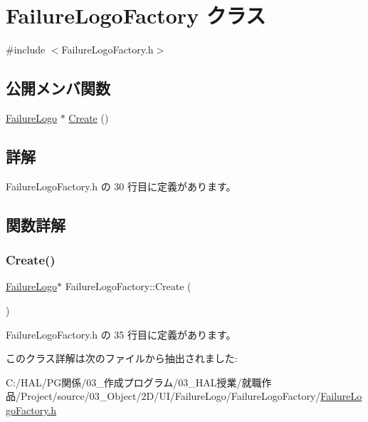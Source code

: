 \hypertarget{class_failure_logo_factory}{}\section{Failure\+Logo\+Factory クラス}
\label{class_failure_logo_factory}


{\ttfamily \#include $<$Failure\+Logo\+Factory.\+h$>$}

\subsection*{公開メンバ関数}
\begin{DoxyCompactItemize}
\item 
\mbox{\hyperlink{class_failure_logo}{Failure\+Logo}} $\ast$ \mbox{\hyperlink{class_failure_logo_factory_a623d73668a89fceca9dc013112b4c8a3}{Create}} ()
\end{DoxyCompactItemize}


\subsection{詳解}


 Failure\+Logo\+Factory.\+h の 30 行目に定義があります。



\subsection{関数詳解}
\mbox{\label{class_failure_logo_factory_a623d73668a89fceca9dc013112b4c8a3}} 
\subsubsection{\texorpdfstring{Create()}{Create()}}
{\footnotesize\ttfamily \mbox{\hyperlink{class_failure_logo}{Failure\+Logo}}$\ast$ Failure\+Logo\+Factory\+::\+Create (\begin{DoxyParamCaption}{ }\end{DoxyParamCaption})\hspace{0.3cm}{\ttfamily [inline]}}



 Failure\+Logo\+Factory.\+h の 35 行目に定義があります。



このクラス詳解は次のファイルから抽出されました\+:\begin{DoxyCompactItemize}
\item 
C\+:/\+H\+A\+L/\+P\+G関係/03\+\_\+作成プログラム/03\+\_\+\+H\+A\+L授業/就職作品/\+Project/source/03\+\_\+\+Object/2\+D/\+U\+I/\+Failure\+Logo/\+Failure\+Logo\+Factory/\mbox{\hyperlink{_failure_logo_factory_8h}{Failure\+Logo\+Factory.\+h}}\end{DoxyCompactItemize}
